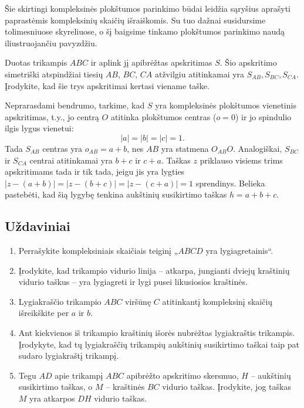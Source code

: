 \documentclass[11pt,a4paper,twoside]{book}
\begin{document}
Šie skirtingi kompleksinės plokštumos parinkimo būdai leidžia sąryšius aprašyti
paprastėmis kompleksinių skaičių išraiškomis. Su tuo dažnai susidursime
tolimesniuose skyreliuose, o šį baigsime tinkamo plokštumos parinkimo naudą
iliustruojančiu pavyzdžiu.

\begin{pav}
Duotas trikampis $ABC$ ir aplink jį apibrėžtas apskritimas $S$. Šio apskritimo simetriški atspindžiai tiesių $AB$, $BC$, $CA$ atžvilgiu atitinkamai yra $S_{AB}, S_{BC}, S_{CA}$. Įrodykite, kad šie trys apskritimai kertasi viename taške.
\end{pav}

\begin{sprendimas}
  Neprarasdami bendrumo, tarkime, kad $S$ yra kompleksinės plokštumos vienetinis
  apskritimas, t.y., jo centrą $O$ atitinka plokštumos centras ($o=0$) ir jo
  spindulio ilgis lygus vienetui: 
  $$
  |a|=|b|=|c|=1.
  $$
  Tada $S_{AB}$ centras yra $o_{AB}=a+b$, nes $AB$ yra statmena $O_{AB}O$.
  Analogiškai, $S_{BC}$ ir $S_{CA}$ centrai atitinkamai yra $b+c$ ir $c+a$.
  Taškas $z$ priklauso visiems trims apskritimams tada ir tik tada, jeigu jis
  yra lygties $|z-(a+b)|=|z-(b+c)|=|z-(c+a)|=1$ sprendinys. Belieka pastebėti,
  kad šią lygybę tenkina aukštinių susikirtimo taškas $h=a+b+c$.
\end{sprendimas}

\subsection{Uždaviniai}

\begin{enumerate}
  \item Perrašykite kompleksiniais skaičiais teiginį „$ABCD$ yra
    lygiagretainis“. 
  \item Įrodykite, kad trikampio vidurio linija -- atkarpa, jungianti dviejų
    kraštinių vidurio taškus -- yra lygiagreti ir lygi pusei likusiosios
    kraštinės.
  \item Lygiakraščio trikampio $ABC$ viršūnę $C$ atitinkantį kompleksinį skaičių
    išreikškite per $a$ ir $b$.
  \item Ant kiekvienos iš trikampio kraštinių išorės nubrėžtas lygiakraštis
    trikampis. Įrodykyte, kad tų lygiakraščių trikampių aukštinių susikirtimo
    taškai taip pat sudaro lygiakraštį trikampį.
  \item Tegu $AD$ apie trikampį $ABC$ apibrėžto apskritimo skersmuo, $H$ --
    aukštinių susikirtimo taškas, o $M$ -- kraštinės $BC$ vidurio taškas.
    Įrodykite, jog taškas $M$ yra atkarpos $DH$ vidurio taškas.

\end{enumerate}
\end{document}

